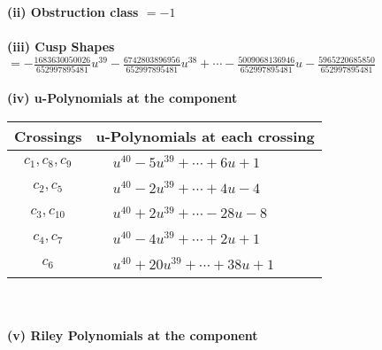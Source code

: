 \documentclass[1p]{elsarticle_modified}
\theoremstyle{definition}
\begin{document}
\flushleft \textbf{(ii) Obstruction class $= -1$}\\~\\
\flushleft \textbf{(iii) Cusp Shapes $= -\frac{1683630050026}{652997895481} u^{39}-\frac{6742803896956}{652997895481} u^{38}+\cdots-\frac{5009068136946}{652997895481} u-\frac{5965220685850}{652997895481}$}\\~\\
\newpage\renewcommand{\arraystretch}{1}
\flushleft \textbf{(iv) u-Polynomials at the component}\newline \\
\begin{tabular}{m{50pt}|m{274pt}}
Crossings & \hspace{64pt}u-Polynomials at each crossing \\
\hline $$\begin{aligned}c_{1},c_{8},c_{9}\end{aligned}$$&$\begin{aligned}
&u^{40}-5 u^{39}+\cdots+6 u+1
\end{aligned}$\\
\hline $$\begin{aligned}c_{2},c_{5}\end{aligned}$$&$\begin{aligned}
&u^{40}-2 u^{39}+\cdots+4 u-4
\end{aligned}$\\
\hline $$\begin{aligned}c_{3},c_{10}\end{aligned}$$&$\begin{aligned}
&u^{40}+2 u^{39}+\cdots-28 u-8
\end{aligned}$\\
\hline $$\begin{aligned}c_{4},c_{7}\end{aligned}$$&$\begin{aligned}
&u^{40}-4 u^{39}+\cdots+2 u+1
\end{aligned}$\\
\hline $$\begin{aligned}c_{6}\end{aligned}$$&$\begin{aligned}
&u^{40}+20 u^{39}+\cdots+38 u+1
\end{aligned}$\\
\hline
\end{tabular}\\~\\
\newpage\renewcommand{\arraystretch}{1}
\flushleft \textbf{(v) Riley Polynomials at the component}\newline \\
\end{document}
